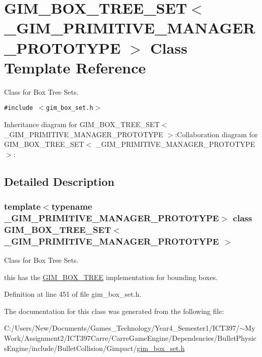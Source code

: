 \hypertarget{class_g_i_m___b_o_x___t_r_e_e___s_e_t}{
\section{GIM\_\-BOX\_\-TREE\_\-SET$<$ \_\-GIM\_\-PRIMITIVE\_\-MANAGER\_\-PROTOTYPE $>$ Class Template Reference}
\label{class_g_i_m___b_o_x___t_r_e_e___s_e_t}
}
Class for Box Tree Sets.  


{\tt \#include $<$gim\_\-box\_\-set.h$>$}

Inheritance diagram for GIM\_\-BOX\_\-TREE\_\-SET$<$ \_\-GIM\_\-PRIMITIVE\_\-MANAGER\_\-PROTOTYPE $>$:Collaboration diagram for GIM\_\-BOX\_\-TREE\_\-SET$<$ \_\-GIM\_\-PRIMITIVE\_\-MANAGER\_\-PROTOTYPE $>$:

\subsection{Detailed Description}
\subsubsection*{template$<$typename \_\-GIM\_\-PRIMITIVE\_\-MANAGER\_\-PROTOTYPE$>$ class GIM\_\-BOX\_\-TREE\_\-SET$<$ \_\-GIM\_\-PRIMITIVE\_\-MANAGER\_\-PROTOTYPE $>$}

Class for Box Tree Sets. 

this has the \hyperlink{class_g_i_m___b_o_x___t_r_e_e}{GIM\_\-BOX\_\-TREE} implementation for bounding boxes. 

Definition at line 451 of file gim\_\-box\_\-set.h.

The documentation for this class was generated from the following file:\begin{CompactItemize}
\item 
C:/Users/New/Documents/Games\_\-Technology/Year4\_\-Semester1/ICT397/$\sim$My Work/Assignment2/ICT397Carre/CarreGameEngine/Dependencies/BulletPhysicsEngine/include/BulletCollision/Gimpact/\hyperlink{gim__box__set_8h}{gim\_\-box\_\-set.h}\end{CompactItemize}
